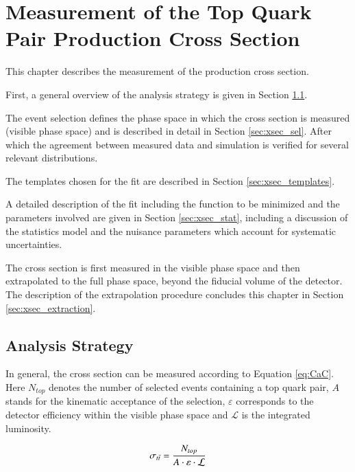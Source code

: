 \chapter{Measurement of the Top Quark Pair Production Cross Section}
\label{sec:xsec}

This chapter describes the measurement of the \ttbar production cross section.

First, a general overview of the analysis strategy is given in Section \ref{sec:xsec_strat}.

The event selection defines the phase space in which the \ttbar cross section is measured (visible phase space) and is described in detail in Section \ref{sec:xsec_sel}.
After which the agreement between measured data and simulation is verified for several relevant distributions.

The templates chosen for the fit are described in Section \ref{sec:xsec_templates}.

A detailed description of the fit including the function to be minimized and the parameters involved are given in Section \ref{sec:xsec_stat},
including a discussion of the statistics model and the nuisance parameters which account for systematic uncertainties.

The cross section is first measured in the visible phase space and then extrapolated to the full phase space, \ie beyond the fiducial volume of the detector. The description of the extrapolation procedure concludes this chapter in Section \ref{sec:xsec_extraction}.

\section{Analysis Strategy}
\label{sec:xsec_strat}

In general, the cross section can be measured according to Equation \ref{eq:CaC}. Here $N_{top}$ denotes the number of selected events containing a top quark pair, $A$ stands for the kinematic acceptance of the selection,
$\varepsilon$ corresponds to the  detector efficiency within the visible phase space and $\mathcal{L}$ is the integrated luminosity.


\begin{equation}
\sigma_{t\bar{t}} = \frac{N_{top}}{A \cdot \varepsilon \cdot \mathcal{L}}
\label{eq:CaC}
\end{equation} 


